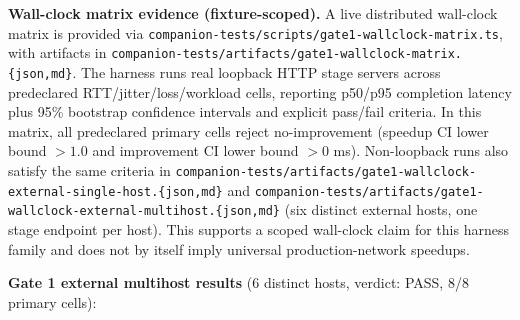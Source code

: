 \documentclass[
  11pt,
]{article}
\begin{document}
\textbf{Wall-clock matrix evidence (fixture-scoped).} A live distributed
wall-clock matrix is provided via
\texttt{companion-\allowbreak{}tests/\allowbreak{}scripts/\allowbreak{}gate1-\allowbreak{}wallclock-\allowbreak{}matrix.\allowbreak{}ts}, with
artifacts in
\texttt{companion-\allowbreak{}tests/\allowbreak{}artifacts/\allowbreak{}gate1-\allowbreak{}wallclock-\allowbreak{}matrix.\allowbreak{}\{json,md\}}.
The harness runs real loopback HTTP stage servers across predeclared
RTT/jitter/loss/workload cells, reporting p50/p95 completion latency
plus 95\% bootstrap confidence intervals and explicit pass/fail
criteria. In this matrix, all predeclared primary cells reject
no-improvement (speedup CI lower bound \(> 1.0\) and improvement CI
lower bound \(> 0\) ms). Non-loopback runs also satisfy the same
criteria in
\texttt{companion-\allowbreak{}tests/\allowbreak{}artifacts/\allowbreak{}gate1-\allowbreak{}wallclock-\allowbreak{}external-\allowbreak{}single-\allowbreak{}host.\allowbreak{}\{json,md\}}
and
\texttt{companion-\allowbreak{}tests/\allowbreak{}artifacts/\allowbreak{}gate1-\allowbreak{}wallclock-\allowbreak{}external-\allowbreak{}multihost.\allowbreak{}\{json,md\}}
(six distinct external hosts, one stage endpoint per host). This
supports a scoped wall-clock claim for this harness family and does not
by itself imply universal production-network speedups.

\textbf{Gate 1 external multihost results} (6 distinct hosts, verdict:
PASS, 8/8 primary cells):
\end{document}
